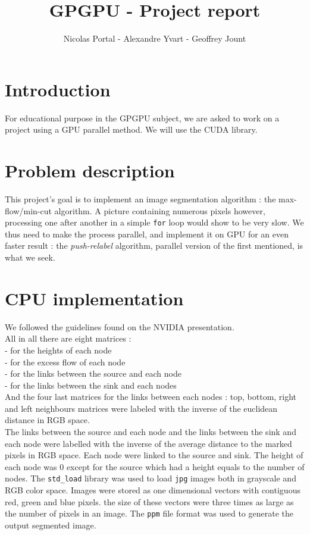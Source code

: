 \documentclass{article}
\title{GPGPU - Project report}
\author{Nicolas Portal - Alexandre Yvart - Geoffrey Jount}
\begin{document}
\maketitle


\pagebreak
\tableofcontents


\pagebreak
{}

\section{Introduction}

For educational purpose in the GPGPU subject, we are asked to work on a project
using a GPU parallel method. We will use the CUDA library.

\section{Problem description}

This project's goal is to implement an image segmentation algorithm :
the max-flow/min-cut algorithm. A picture containing numerous pixels however,
processing one after another in a simple \texttt{for} loop would show to be
very slow. We thus need to make the process parallel, and implement it on GPU
for an even faster result : the \textit{push-relabel} algorithm, parallel
version of the first mentioned, is what we seek.

\section{CPU implementation}

We followed the guidelines found on the NVIDIA presentation.\\
All in all there are eight matrices :\\
- for the heights of each node\\
- for the excess flow of each node\\
- for the links between the source and each node\\
- for the links between the sink and each nodes\\
And the four last matrices for the links between each nodes : top, bottom, right and left neighbours matrices were labeled with the inverse of the euclidean distance in RGB space.\\
The links between the source and each node and the links between the sink and each node were labelled with the inverse of the average distance to the marked pixels in RGB space. Each node were linked to the source and sink. The height of each node was 0 except for the source which had a height equals to the number of nodes. The \texttt{std\string_load} library was used to load \texttt{jpg} images both in grayscale and RGB color space. Images were stored as one dimensional vectors with contiguous red, green and blue pixels. the size of these vectors were three times as large as the number of pixels in an image. The \texttt{ppm} file format was used to generate the output segmented image.
\end{document}
